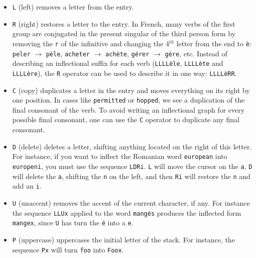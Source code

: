 \begin{itemize}
  \item \verb+L+ (left) removes a letter from the entry.
  
  \item \verb+R+ (right) restores a letter to the entry.
  In French, many verbs
  of the first group are conjugated in the present singular  of the third person form  by removing the
  \verb+r+ of the infinitive and changing the 4$^{th}$ letter from the end to
  \texttt{\`e}: \verb+peler+ $\rightarrow$ \texttt{p\`ele},
  \verb+acheter+ $\rightarrow$ \texttt{ach\`ete}, \texttt{g\'erer}
  $\rightarrow$ \texttt{g\`ere}, etc. Instead of describing an inflectional
  suffix for each verb (\texttt{LLLL\`ele}, \texttt{LLLL\`ete} and
  \texttt{LLLL\`ere}), the \verb+R+ operator can be used to
  describe it in one way: \texttt{LLLL\`eRR}.
  
  \item \verb+C+ (copy)
  duplicates a letter in the entry and moves everything on
  its right by one position. In cases like \verb+permitted+ or \verb+hopped+, we
  see a duplication of the final consonant of the verb. To avoid writing an
  inflectional graph for every possible final consonant, one can use the \verb+C+
  operator to duplicate any final consonant.
  
  \item \verb+D+ (delete) deletes a
  letter, shifting anything located on the right of this letter. For instance, if
  you want to inflect the Romanian word \verb+european+ into \verb+europeni+, you
  must use the sequence \verb+LDRi+. \verb+L+ will move the cursor on the
  \verb+a+, \verb+D+ will delete the \verb+a+, shifting the \verb+n+ on the left,
  and then \verb+Ri+ will restore the \verb+n+ and add an \verb+i+.

  \item \verb+U+ (unaccent)
  removes the accent of the current character, if
  any. For instance the sequence \verb+LLUx+ applied to the word
  \texttt{mang\'es} produces the inflected form \verb+mangex+, since \verb+U+
  has turn the \texttt{\'e} into a \verb+e+.

  \item \verb+P+ (uppercase)
  uppercases the initial letter of the stack. For
  instance, the sequence \verb$Px$ will turn \verb$foo$ into \verb$Foox$.
  

\end{itemize}
